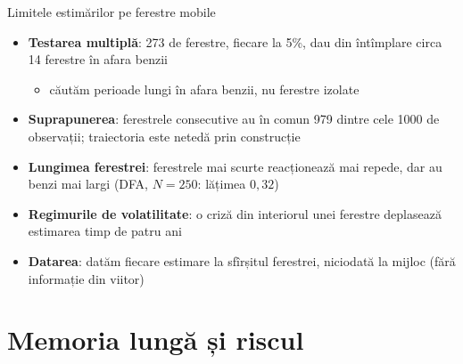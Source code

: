 \begin{frame}{Limitele estimărilor pe ferestre mobile}
\itemsize{\small}
\begin{itemize}
    \item \textbf{Testarea multiplă}: 273 de ferestre, fiecare la 5\%, dau din întîmplare circa 14 ferestre în afara benzii
    \begin{itemize}
        \item căutăm perioade lungi în afara benzii, nu ferestre izolate
    \end{itemize}
    \item \textbf{Suprapunerea}: ferestrele consecutive au în comun 979 dintre cele 1000 de observații; traiectoria este netedă prin construcție
    \item \textbf{Lungimea ferestrei}: ferestrele mai scurte reacționează mai repede, dar au benzi mai largi (DFA, $N = 250$: lățimea $0{,}32$)
    \item \textbf{Regimurile de volatilitate}: o criză din interiorul unei ferestre deplasează estimarea timp de patru ani
    \item \textbf{Datarea}: datăm fiecare estimare la sfîrșitul ferestrei, niciodată la mijloc (fără informație din viitor)
\end{itemize}
\end{frame}


\section{Memoria lungă și riscul}

